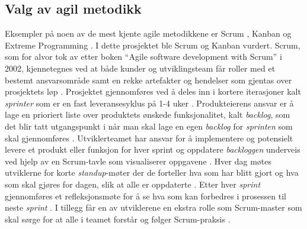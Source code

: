 \subsection{Valg av agil metodikk}
Eksempler på noen av de mest kjente agile metodikkene er Scrum \cite{HomeScrumOrg}, Kanban og Extreme Programming \cite{wellsExtremeProgrammingGentle2009}. I dette prosjektet ble Scrum og Kanban vurdert. 
\newline
\newline
Scrum, som for alvor tok av etter boken \enquote{Agile software development with Scrum} \cite{schwaberAgileSoftwareDevelopment2002} i 2002, kjennetegnes ved at både kunder og utviklingsteam får roller med et bestemt ansvarsområde samt en rekke artefakter og hendelser som gjentas over prosjektets løp \cite{WhatScrum}. Prosjektet gjennomføres ved å deles inn i kortere iterasjoner kalt \textit{sprinter} \cite{WhatScrum} som er en fast leveransesyklus på 1-4 uker \cite{nesKortIntroduksjonTil2019}. Produkteierens ansvar er å lage en prioriert liste over produktets ønskede funksjonalitet, kalt \textit{backlog}, som det blir tatt utgangspunkt i når man skal lage en egen \textit{backlog} for \textit{sprinten} som skal gjennomføres \cite[~s.24]{rannikkoUserCenteredDesignAgile2011}. Utviklerteamet har ansvar for å implementere og potensielt levere et produkt eller funksjon for hver sprint og oppdatere \textit{backloggen} underveis ved hjelp av en Scrum-tavle som visualiserer oppgavene \cite[~s.24]{rannikkoUserCenteredDesignAgile2011}. Hver dag møtes utviklerne for korte \textit{standup}-møter der de forteller hva som har blitt gjort og hva som skal gjøres for dagen, slik at alle er oppdaterte \cite{WhatScrum}. Etter hver \textit{sprint} gjennomføres et refleksjonsmøte for å se hva som kan forbedres i prosessen til neste \textit{sprint} \cite{WhatScrum}. I tillegg får en av utviklerene en ekstra rolle som Scrum-master som skal sørge for at alle i teamet forstår og følger Scrum-praksis \cite[~s.24]{rannikkoUserCenteredDesignAgile2011}. 
\newline
\newline
